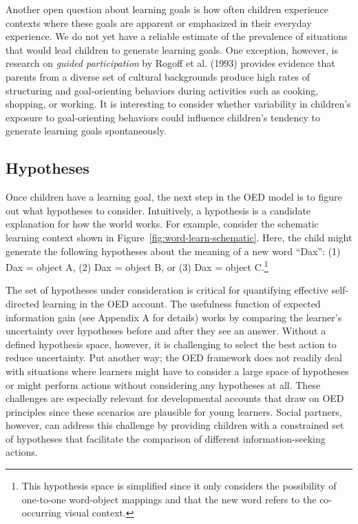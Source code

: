 \documentclass[oneside]{report}
\begin{document}
Another open question about learning goals is how often children
experience contexts where these goals are apparent or emphasized in
their everyday experience. We do not yet have a reliable estimate of the
prevalence of situations that would lead children to generate learning
goals. One exception, however, is research on \emph{guided
participation} by Rogoff et al. (1993) provides evidence that parents
from a diverse set of cultural backgrounds produce high rates of
structuring and goal-orienting behaviors during activities such as
cooking, shopping, or working. It is interesting to consider whether
variability in children's exposure to goal-orienting behaviors could
influence children's tendency to generate learning goals spontaneously.

\subsection{Hypotheses}\label{hypotheses}

Once children have a learning goal, the next step in the OED model is to
figure out what hypotheses to consider. Intuitively, a hypothesis is a
candidate explanation for how the world works. For example, consider the
schematic learning context shown in
Figure~\ref{fig:word-learn-schematic}. Here, the child might generate
the following hypotheses about the meaning of a new word ``Dax'': (1)
Dax = object A, (2) Dax = object B, or (3) Dax = object C.\footnote{This
  hypothesis space is simplified since it only considers the possibility
  of one-to-one word-object mappings and that the new word refers to the
  co-occurring visual context.}

The set of hypotheses under consideration is critical for quantifying
effective self-directed learning in the OED account. The usefulness
function of expected information gain (see Appendix A for details) works
by comparing the learner's uncertainty over hypotheses before and after
they see an answer. Without a defined hypothesis space, however, it is
challenging to select the best action to reduce uncertainty. Put another
way; the OED framework does not readily deal with situations where
learners might have to consider a large space of hypotheses or might
perform actions without considering any hypotheses at all. These
challenges are especially relevant for developmental accounts that draw
on OED principles since these scenarios are plausible for young
learners. Social partners, however, can address this challenge by
providing children with a constrained set of hypotheses that facilitate
the comparison of different information-seeking actions.
\end{document}
